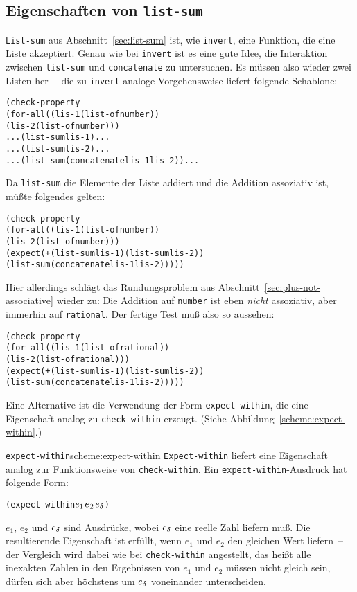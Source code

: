 \subsection{Eigenschaften von \texttt{list-sum}}

\texttt{List-sum} aus
Abschnitt~\ref{sec:list-sum} ist, wie \texttt{invert}, eine Funktion,
die eine Liste akzeptiert.  Genau wie bei \texttt{invert} ist es eine
gute Idee, die Interaktion zwischen \texttt{list-sum} und
\texttt{concatenate} zu untersuchen.  Es müssen also wieder zwei
Listen her~-- die zu \texttt{invert} analoge Vorgehensweise liefert
folgende Schablone:
%
\begin{alltt}
(check-property
 (for-all ((lis-1 (list-of number))
           (lis-2 (list-of number)))
    ... (list-sum lis-1) ...
    ... (list-sum lis-2) ...
    ... (list-sum (concatenate lis-1 lis-2)) ...
\end{alltt}
%
Da \texttt{list-sum} die Elemente der Liste addiert und die Addition
assoziativ ist, müßte folgendes gelten:
%
\begin{alltt}
(check-property
 (for-all ((lis-1 (list-of number))
           (lis-2 (list-of number)))
    (expect (+ (list-sum lis-1) (list-sum lis-2))
            (list-sum (concatenate lis-1 lis-2)))))
\end{alltt}
%
Hier allerdings schlägt das Rundungsproblem aus
Abschnitt~\ref{sec:plus-not-associative} wieder zu: Die Addition auf
\texttt{number} ist eben \emph{nicht} assoziativ, aber immerhin auf
\texttt{rational}.  Der fertige Test muß also so aussehen:
%
\begin{alltt}
(check-property
 (for-all ((lis-1 (list-of rational))
           (lis-2 (list-of rational)))
    (expect (+ (list-sum lis-1) (list-sum lis-2))
            (list-sum (concatenate lis-1 lis-2)))))
\end{alltt}
%
Eine Alternative ist die Verwendung der Form
\texttt{expect-within},
die eine Eigenschaft analog zu \texttt{check-within} erzeugt.  (Siehe
Abbildung~\ref{scheme:expect-within}.)

\begin{feature}{\texttt{expect-within}}{scheme:expect-within}
  \texttt{Expect-within} liefert eine
  Eigenschaft analog zur Funktionsweise von
  \texttt{check-within}.  Ein \texttt{expect-within}-Ausdruck hat folgende
  Form:
\begin{alltt}
(expect-within \(e\sb{1}\)  \(e\sb{2}\) \(e\sb{\delta}\))
\end{alltt}
%
$e_1$, $e_2$ und $e\sb{\delta}$ sind Ausdrücke, wobei $e\sb{\delta}$
eine reelle Zahl liefern muß.  Die resultierende Eigenschaft ist
erfüllt, wenn $e_1$ und $e_2$ den gleichen Wert liefern~-- der
Vergleich wird dabei wie bei \texttt{check-within} angestellt, das heißt
alle inexakten Zahlen in den Ergebnissen von $e_1$ und $e_2$ müssen
nicht gleich sein, dürfen sich aber höchstens um $e\sb{\delta}$
voneinander unterscheiden.
\end{feature}

